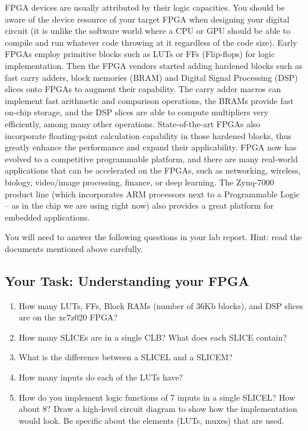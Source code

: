 \documentclass[11pt]{article}
\begin{document}
FPGA devices are usually attributed by their logic capacities. You should be aware of the device resource of your target FPGA when designing your digital circuit (it is unlike the software world where a CPU or GPU should be able to compile and run whatever code throwing at it regardless of the code size). Early FPGAs employ primitive blocks such as LUTs or FFs (Flip-flops) for logic implementation. Then the FPGA vendors started adding hardened blocks such as fast carry adders, block memories (BRAM) and Digital Signal Processing (DSP) slices onto FPGAs to augment their capability. The carry adder macros can implement fast arithmetic and comparison operations, the BRAMs provide fast on-chip storage, and the DSP slices are able to compute multipliers very efficiently, among many other operations. State-of-the-art FPGAs also incorporate floating-point calculation capability in those hardened blocks, thus greatly enhance the performance and expand their applicability. FPGA now has evolved to a competitive programmable platform, and there are many real-world applications that can be accelerated on the FPGAs, such as networking, wireless, biology, video/image processing, finance, or deep learning. The Zynq-7000 product line (which incorporates ARM processors next to a Programmable Logic -- as in the chip we are using right now) also provides a great platform for embedded applications.

You will need to answer the following questions in your lab report. Hint: read the documents mentioned above carefully.

\subsection{Your Task: Understanding your FPGA}\label{sec:fpgaQuestions}
\begin{enumerate}
  \item How many LUTs, FFs, Block RAMs (number of 36Kb blocks), and DSP slices are on the xc7z020 FPGA?
  \item How many SLICEs are in a single CLB? What does each SLICE contain?
  \item What is the difference between a SLICEL and a SLICEM?
  \item How many inputs do each of the LUTs have?
  \item How do you implement logic functions of 7 inputs in a single SLICEL? How about 8? Draw a high-level circuit diagram to show how the implementation would look. Be specific about the elements (LUTs, muxes) that are used.
\end{enumerate}
\end{document}

